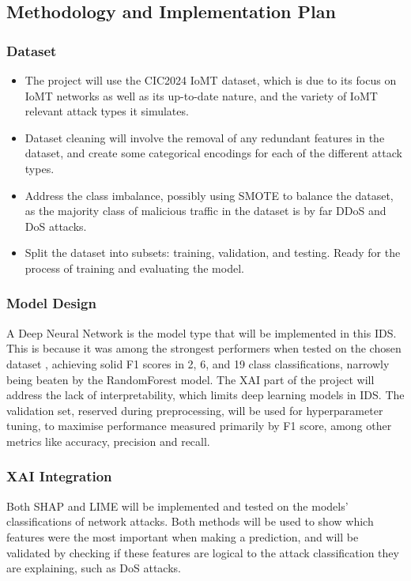 \documentclass[11pt,a4paper]{article}
\begin{document}
\subsection{Methodology and Implementation Plan}
\subsubsection{Dataset}
\begin{itemize}
    \item The project will use the CIC2024 IoMT dataset, which is due to its focus on IoMT networks as well as its up-to-date nature, and the variety of IoMT relevant attack types it simulates.
    \item Dataset cleaning will involve the removal of any redundant features in the dataset, and create some categorical encodings for each of the different attack types.
    \item Address the class imbalance, possibly using SMOTE to balance the dataset, as the majority class of malicious traffic in the dataset is by far DDoS and DoS attacks.
    \item Split the dataset into subsets: training, validation, and testing. Ready for the process of training and evaluating the model.
\end{itemize}

\subsubsection{Model Design}
A Deep Neural Network is the model type that will be implemented in this IDS. This is because it was among the strongest performers when tested on the chosen dataset \cite{dadkhah2024ciciomt2024}, achieving solid F1 scores in 2, 6, and 19 class classifications, narrowly being beaten by the RandomForest model. The XAI part of the project will address the lack of interpretability, which limits deep learning models in IDS.
The validation set, reserved during preprocessing, will be used for hyperparameter tuning, to maximise performance measured primarily by F1 score, among other metrics like accuracy, precision and recall.

\subsubsection{XAI Integration}
Both SHAP and LIME will be implemented and tested on the models’ classifications of network attacks. Both methods will be used to show which features were the most important when making a prediction, and will be validated by checking if these features are logical to the attack classification they are explaining, such as DoS attacks.
\end{document}

